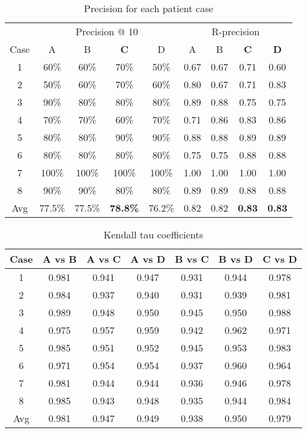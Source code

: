 \begin{table}[htbp] \footnotesize \center
\caption{Precision for each patient case\label{tab:precision}}
\begin{tabular}{c c c c c c c c c}
    \toprule
    & \multicolumn{4}{c}{Precision @ 10} & \multicolumn{4}{c}{R-precision} \\
	\cmidrule(r){2-9}
	Case & A & B & \textbf{C} & D & A & B & \textbf{C} & \textbf{D} \\
    \midrule
	1 & 60\% & 60\% & 70\% & 50\% & 0.67 & 0.67 & 0.71 & 0.60 \\
	2 & 50\% & 60\% & 70\% & 60\% & 0.80 & 0.67 & 0.71 & 0.83 \\
	3 & 90\% & 80\% & 80\% & 80\% & 0.89 & 0.88 & 0.75 & 0.75 \\
	4 & 70\% & 70\% & 60\% & 70\% & 0.71 & 0.86 & 0.83 & 0.86 \\
	5 & 80\% & 80\% & 90\% & 90\% & 0.88 & 0.88 & 0.89 & 0.89 \\
	6 & 80\% & 80\% & 80\% & 80\% & 0.75 & 0.75 & 0.88 & 0.88 \\
	7 & 100\% & 100\% & 100\% & 100\% & 1.00 & 1.00 & 1.00 & 1.00 \\
	8 & 90\% & 90\% & 80\% & 80\% & 0.89 & 0.89 & 0.88 & 0.88 \\
    \midrule
	Avg & 77.5\% & 77.5\% & \textbf{78.8\%} & 76.2\% & 0.82 & 0.82 & \textbf{0.83} & \textbf{0.83} \\
	\bottomrule
\end{tabular}
\end{table}

\begin{table}[htbp] \footnotesize \center
\caption{Kendall tau coefficients\label{tab:kendalltau}}
\begin{tabular}{c c c c c c c}
    \toprule
	Case & A vs B & A vs C & A vs D & B vs C & B vs D & C vs D \\
    \midrule
	1 & 0.981 & 0.941 & 0.947 & 0.931 & 0.944 & 0.978 \\
	2 & 0.984 & 0.937 & 0.940 & 0.931 & 0.939 & 0.981 \\
	3 & 0.989 & 0.948 & 0.950 & 0.945 & 0.950 & 0.988 \\
	4 & 0.975 & 0.957 & 0.959 & 0.942 & 0.962 & 0.971 \\
	5 & 0.985 & 0.951 & 0.952 & 0.945 & 0.953 & 0.983 \\
	6 & 0.971 & 0.954 & 0.954 & 0.937 & 0.960 & 0.964 \\
	7 & 0.981 & 0.944 & 0.944 & 0.936 & 0.946 & 0.978 \\
	8 & 0.985 & 0.943 & 0.948 & 0.935 & 0.944 & 0.984 \\
    \midrule
	Avg & 0.981 & 0.947 & 0.949 & 0.938 & 0.950 & 0.979 \\
	\bottomrule
\end{tabular}
\end{table}


